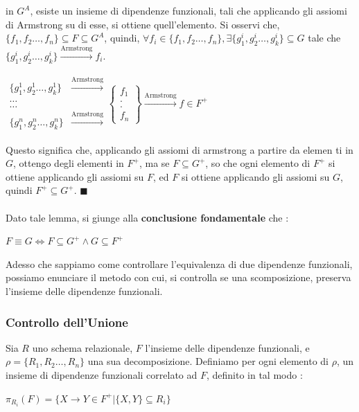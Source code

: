 \documentclass[12pt, letterpaper]{article}
\newcommand{\acc}{\\\hphantom{}\\}
\begin{document}
in \(G^A\), esiste un insieme di dipendenze funzionali, tali che applicando gli assiomi di Armstrong su di esse, si ottiene 
quell'elemento. Si osservi che, \(\{f_1,f_2\dots,f_n\}\subseteq F \subseteq G^A\), quindi, \(\forall f_i\in \{f_1,f_2\dots,f_n\}
, \exists \{g_1^i,g_2^i\dots,g_k^i\}\subseteq G \) tale che \( \{g_1^i,g_2^i\dots,g_k^i\}\xrightarrow[\text{}]{\text{Armstrong}}f_i\).
\begin{center}
    \(\begin{matrix}
        \{g_1^1,g_2^1\dots,g_k^1\}&\xrightarrow[\text{}]{\text{Armstrong}}\\\dots\\\dots\\
        \{g_1^n,g_2^n\dots,g_k^n\}&\xrightarrow[\text{}]{\text{Armstrong}}
    \end{matrix}\begin{Bmatrix}
        f_1\\.\\.\\f_n
        \end{Bmatrix}\xrightarrow[\text{}]{\text{Armstrong}}f\in F^+\)
\end{center}
Questo significa che, applicando gli assiomi di armstrong a partire da elemen ti in \(G\), ottengo degli elementi 
in \(F^+\), ma se \(F\subseteq G^+\), so che ogni elemento di \(F^+\) si ottiene applicando gli assiomi 
su \(F\), ed \(F\) si ottiene applicando gli assiomi su \(G\), quindi \(F^+\subseteq G^+\). \(\blacksquare\)\acc 
Dato tale lemma, si giunge alla \textbf{conclusione fondamentale} che : \begin{center}
    \(F\equiv G\iff F\subseteq G^+\land G\subseteq F^+\)
\end{center}
Adesso che sappiamo come controllare l'equivalenza di due dipendenze funzionali, possiamo enunciare il metodo con cui, si controlla 
se una scomposizione, preserva l'insieme delle dipendenze funzionali.\subsubsection{Controllo dell'Unione}
Sia \(R\) uno schema relazionale, \(F\) l'insieme delle dipendenze funzionali, e \(\rho=\{R_1,R_2\dots,R_n\}\) una sua decomposizione.
Definiamo per ogni elemento di \(\rho\), un insieme di dipendenze funzionali correlato ad \(F\), definito in tal modo : \begin{center}
    \(\pi_{R_i}(F)=\{X\rightarrow Y\in F^+|\{X,Y\}\subseteq R_i\}\)
\end{center}
\end{document}
